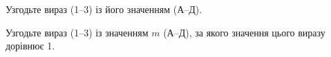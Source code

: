 \documentclass[12pt]{article}
\begin{document}
\begin{samepage}
\noindent\zadnum Узгодьте вираз \mbox{(1--3)} із його значенням \mbox{(А--Д)}. \par
\nopagebreak\nbvspace{0.3cm}

\nmtnobreak
{}
\par{}\vspace{0.25cm}
\end{samepage}

\begin{samepage}
\noindent\zadnum Узгодьте вираз \mbox{(1--3)} із значенням $m$ \mbox{(А--Д)}, за якого значення цього виразу дорівнює 1. \par
\nopagebreak\nbvspace{0.3cm}

\nmtnobreak
{}
\par{}\vspace{0.25cm}
\end{samepage}
\end{document}
